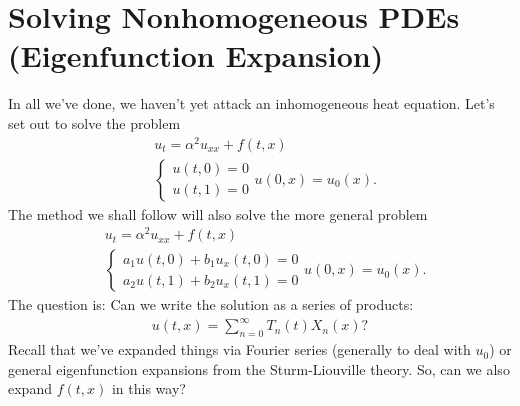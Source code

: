 \documentclass{article}
\theoremstyle{definition}
\begin{document}
\newpage

\section{Solving Nonhomogeneous PDEs (Eigenfunction Expansion)}
In all we've done, we haven't yet attack an inhomogeneous heat equation. Let's set out to solve the problem 
\begin{align*}
&u_t = \alpha^2 u_{xx} + f(t,x)\\
&\begin{cases}
u(t,0) = 0\\
u(t,1) = 0
\end{cases}
u(0,x) = u_0(x).
\end{align*}
The method we shall follow will also solve the more general problem 
\begin{align*}
&u_t = \alpha^2 u_{xx} + f(t,x)\\
&\begin{cases}
a_1u(t,0) + b_1u_x(t,0) = 0\\
a_2u(t,1) + b_2u_x(t,1) = 0
\end{cases}
u(0,x) = u_0(x).
\end{align*}
The question is: Can we write the solution as a series of products:
\begin{align*}
u(t,x) = \sum^\infty_{n=0}T_n(t)X_n(x)?
\end{align*}
Recall that we've expanded things via Fourier series (generally to deal with $u_0$) or general eigenfunction expansions from the Sturm-Liouville theory. So, can we also expand $f(t,x)$ in this way?\\
\end{document}
